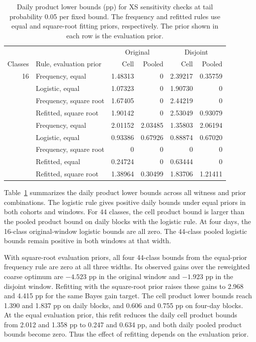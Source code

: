 \documentclass[preprint,11pt]{elsarticle}
\begin{document}
\begin{table}[!ht]
\centering
\small
\setlength{\tabcolsep}{4pt}
\caption{Daily product lower bounds (pp) for XS sensitivity checks at tail probability 0.05 per fixed bound. The frequency and refitted rules use equal and square-root fitting priors, respectively. The prior shown in each row is the evaluation prior.}
\label{tab:xs-sensitivity}
\begin{tabular}{rlrrrr}
\toprule
 & & \multicolumn{2}{c}{Original} & \multicolumn{2}{c}{Disjoint} \\
Classes & Rule, evaluation prior & Cell & Pooled & Cell & Pooled \\
\midrule
16 & Frequency, equal & 1.48313 & 0 & 2.39217 & 0.35759 \\
   & Logistic, equal & 1.07323 & 0 & 1.90730 & 0 \\
   & Frequency, square root & 1.67405 & 0 & 2.44219 & 0 \\
   & Refitted, square root & 1.90142 & 0 & 2.53049 & 0.93079 \\
\addlinespace
44 & Frequency, equal & 2.01152 & 2.03485 & 1.35803 & 2.06194 \\
   & Logistic, equal & 0.93386 & 0.67926 & 0.88874 & 0.67020 \\
   & Frequency, square root & 0 & 0 & 0 & 0 \\
   & Refitted, equal & 0.24724 & 0 & 0.63444 & 0 \\
   & Refitted, square root & 1.38964 & 0.30499 & 1.83706 & 1.21411 \\
\bottomrule
\end{tabular}
\end{table}

Table~\ref{tab:xs-sensitivity} summarizes the daily product lower bounds across all witness and prior combinations. The logistic rule gives positive daily bounds under equal priors in both cohorts and windows. For 44 classes, the cell product bound is larger than the pooled product bound on daily blocks with the logistic rule. At four days, the 16-class original-window logistic bounds are all zero. The 44-class pooled logistic bounds remain positive in both windows at that width.

With square-root evaluation priors, all four 44-class bounds from the equal-prior frequency rule are zero at all three widths. Its observed gains over the reweighted coarse optimum are $-4.523$ pp in the original window and $-1.923$ pp in the disjoint window. Refitting with the square-root prior raises these gains to 2.968 and 4.415 pp for the same Bayes gain target. The cell product lower bounds reach 1.390 and 1.837 pp on daily blocks, and 0.606 and 0.755 pp on four-day blocks. At the equal evaluation prior, this refit reduces the daily cell product bounds from 2.012 and 1.358 pp to 0.247 and 0.634 pp, and both daily pooled product bounds become zero. Thus the effect of refitting depends on the evaluation prior.
\end{document}
